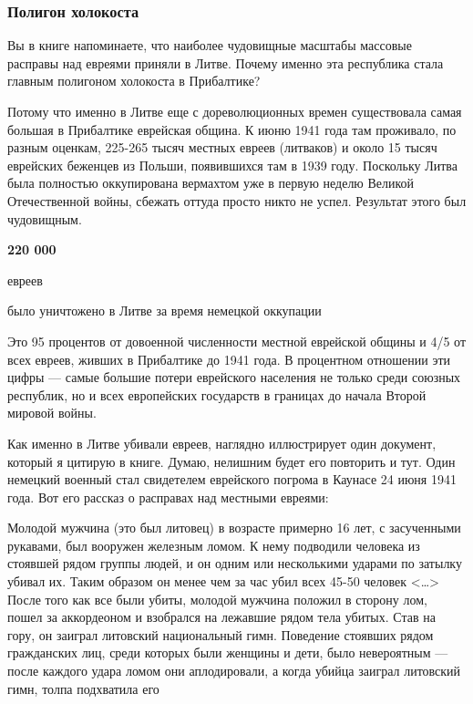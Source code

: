  
 
 
 
 

\subsubsection{Полигон холокоста}

Вы в книге напоминаете, что наиболее чудовищные масштабы массовые расправы над
евреями приняли в Литве. Почему именно эта республика стала главным полигоном
холокоста в Прибалтике?

Потому что именно в Литве еще с дореволюционных времен существовала самая
большая в Прибалтике еврейская община. К июню 1941 года там проживало, по
разным оценкам, 225-265 тысяч местных евреев (литваков) и около 15 тысяч
еврейских беженцев из Польши, появившихся там в 1939 году. Поскольку Литва была
полностью оккупирована вермахтом уже в первую неделю Великой Отечественной
войны, сбежать оттуда просто никто не успел. Результат этого был чудовищным.

\begin{leftbar}
	\bfseries
	\centering
{\Large\color{orange}220 000}\par
				{\large евреев}\par
было уничтожено в Литве за время немецкой оккупации
\end{leftbar}

Это 95 процентов от довоенной численности местной еврейской общины и 4/5 от
всех евреев, живших в Прибалтике до 1941 года. В процентном отношении эти цифры
— самые большие потери еврейского населения не только среди союзных республик,
но и всех европейских государств в границах до начала Второй мировой войны.

Как именно в Литве убивали евреев, наглядно иллюстрирует один документ, который
я цитирую в книге. Думаю, нелишним будет его повторить и тут. Один немецкий
военный стал свидетелем еврейского погрома в Каунасе 24 июня 1941 года. Вот его
рассказ о расправах над местными евреями:

\begin{fancyquotes}
Молодой мужчина (это был литовец) в возрасте примерно 16 лет, с засученными
рукавами, был вооружен железным ломом. К нему подводили человека из стоявшей
рядом группы людей, и он одним или несколькими ударами по затылку убивал их.
Таким образом он менее чем за час убил всех 45-50 человек <…> После того как
все были убиты, молодой мужчина положил в сторону лом, пошел за аккордеоном и
взобрался на лежавшие рядом тела убитых. Став на гору, он заиграл литовский
национальный гимн. Поведение стоявших рядом гражданских лиц, среди которых были
женщины и дети, было невероятным — после каждого удара ломом они аплодировали,
а когда убийца заиграл литовский гимн, толпа подхватила его
\end{fancyquotes}


